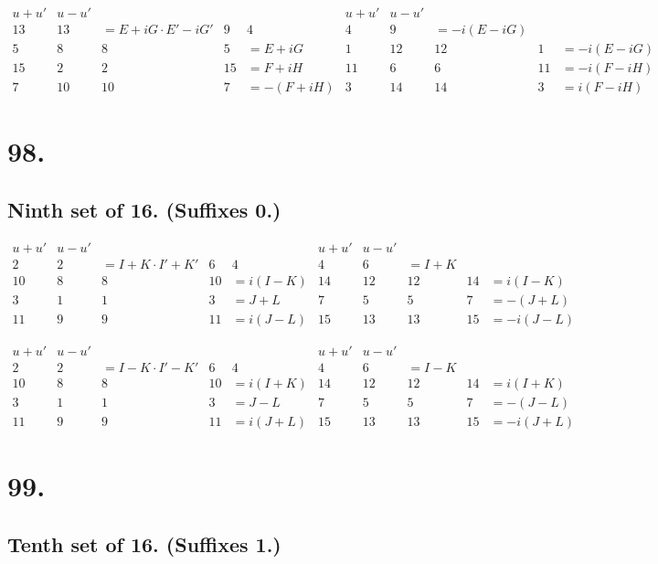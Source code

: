 \documentclass[11pt,a4paper]{article}
\begin{document}
\[
\begin{array}{c|cccc|c|cccc}
u+u' & u-u' & & & & u+u' & u-u' & & & \\
\hline
13 & 13 & = E+iG \cdot E'-iG' & 9 & 4 & 4 & 9 & = -i(E-iG) \\
5 & 8 & 8 & 5 & = E+iG & 1 & 12 & 12 & 1 & = -i(E-iG) \\
15 & 2 & 2 & 15 & = F+iH & 11 & 6 & 6 & 11 & = -i(F-iH) \\
7 & 10 & 10 & 7 & = -(F+iH) & 3 & 14 & 14 & 3 & = i(F-iH)
\end{array}
\]


\newpage
\section*{98.}
\label{sec:98}

\subsection*{Ninth set of 16. (Suffixes 0.)}

\[
\begin{array}{c|cccc|c|cccc}
u+u' & u-u' & & & & u+u' & u-u' & & & \\
\hline
2 & 2 & = I+K \cdot I'+K' & 6 & 4 & 4 & 6 & = I+K \\
10 & 8 & 8 & 10 & = i(I-K) & 14 & 12 & 12 & 14 & = i(I-K) \\
3 & 1 & 1 & 3 & = J+L & 7 & 5 & 5 & 7 & = -(J+L) \\
11 & 9 & 9 & 11 & = i(J-L) & 15 & 13 & 13 & 15 & = -i(J-L)
\end{array}
\]

\[
\begin{array}{c|cccc|c|cccc}
u+u' & u-u' & & & & u+u' & u-u' & & & \\
\hline
2 & 2 & = I-K \cdot I'-K' & 6 & 4 & 4 & 6 & = I-K \\
10 & 8 & 8 & 10 & = i(I+K) & 14 & 12 & 12 & 14 & = i(I+K) \\
3 & 1 & 1 & 3 & = J-L & 7 & 5 & 5 & 7 & = -(J-L) \\
11 & 9 & 9 & 11 & = i(J+L) & 15 & 13 & 13 & 15 & = -i(J+L)
\end{array}
\]

\newpage
\section*{99.}
\label{sec:99}

\subsection*{Tenth set of 16. (Suffixes 1.)}
\end{document}

